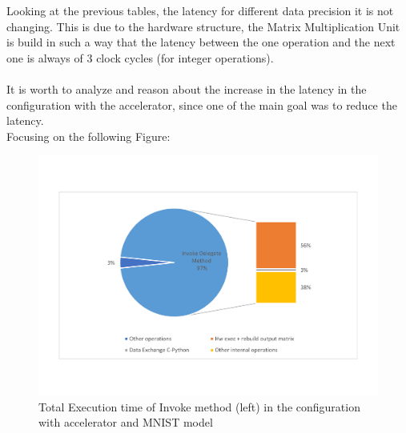 Looking at the previous tables, the latency for different data precision it is not changing. This is due to the hardware structure, the Matrix Multiplication Unit is build in such a way that the latency between the one operation and the next one is always of 3 clock cycles (for integer operations).\\\\
It is worth to analyze and reason about the increase in the latency in the configuration with the accelerator, since one of the main goal was to reduce the latency.\\
Focusing on the following Figure:
\begin{figure}[!htbp]
\centering
\captionsetup{justification=centering}
\includegraphics[scale=0.55,angle=0]{./figure/graphs/latency_subdivision_mnist.pdf}
\caption{Total Execution time of Invoke method (left) in the configuration with accelerator and MNIST model}
\label{fig:totexecmnist}
\end{figure}

